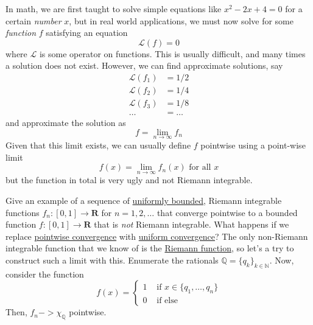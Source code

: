 In math, we are first taught to solve simple equations like $x^2 - 2x + 4 = 0$ for a certain \textit{number} $x$, but in real world applications, we must now solve for some \textit{function} $f$ satisfying an equation 
\begin{equation}
  \mathcal{L}(f) = 0
\end{equation}
where $\mathcal{L}$ is some operator on functions. This is usually difficult, and many times a solution does not exist. However, we can find approximate solutions, say 
\begin{align*}
  \mathcal{L}(f_1) & = 1/2 \\
  \mathcal{L}(f_2) & = 1/4 \\ 
  \mathcal{L}(f_3) & = 1/8 \\
  \ldots & = \ldots 
\end{align*}
and approximate the solution as 
\begin{equation}
  f = \lim_{n \rightarrow \infty} f_n 
\end{equation}
Given that this limit exists, we can usually define $f$ pointwise using a point-wise limit 
\begin{equation}
  f(x) = \lim_{n \rightarrow \infty} f_n (x) \text{ for all } x
\end{equation}
but the function in total is very ugly and not Riemann integrable. 

\begin{example}[Tao 1.2.2]
  \label{ex:tao-1-2-2}
  Give an example of a sequence of \hyperref[real-def:uniformly-bounded]{uniformly bounded}, Riemann integrable functions $f_n : [0,1] \to \mathbf{R}$ for $n = 1, 2, \ldots$ that converge pointwise to a bounded function $f : [0,1] \to \mathbf{R}$ that is \emph{not} Riemann integrable. What happens if we replace \hyperref[real-def:pointwise-convergence]{pointwise convergence} with \hyperref[real-def:uniform-convergence]{uniform convergence}? The only non-Riemann integrable function that we know of is the \hyperref[real-ex:riemann-function]{Riemann function}, so let's a try to construct such a limit with this. Enumerate the rationals $\mathbb{Q} = \{q_k\}_{k \in \mathbb{N}}$. Now, consider the function 
  \begin{equation}
    f (x) = \begin{cases} 
      1 & \text{ if } x \in \{q_1, \ldots, q_n\} \\ 
      0 & \text{ if else}
    \end{cases} 
  \end{equation}
  Then, $f_n -> \chi_{\mathbb{Q}}$ pointwise. 
\end{example}

